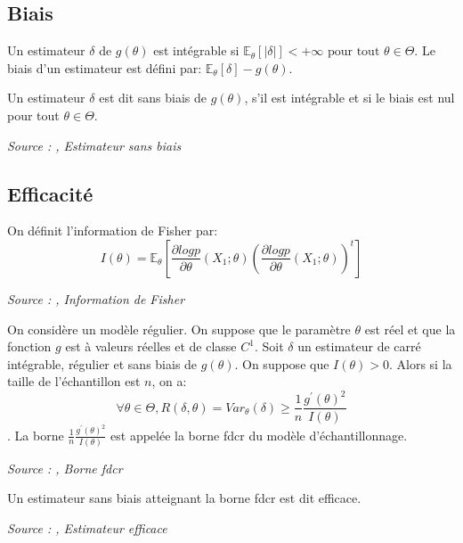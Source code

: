 \subsection{Biais}

\begin{definition}\label{def:biais}
Un estimateur $\delta$ de $g(\theta)$ est intégrable si $\mathbb{E}_\theta[|\delta|] < +\infty \text{ pour tout } \theta \in \Theta$.
Le biais d'un estimateur est défini par: $\mathbb{E}_\theta[\delta] - g(\theta)$.

Un estimateur $\delta$ est dit sans biais de $g(\theta)$, s'il est intégrable et si le biais est nul pour tout $\theta \in \Theta$.

\noindent\textit{Source : \cite{ensta_cours},  Estimateur sans biais}
\end{definition}


\subsection{Efficacité}

\begin{definition}\label{def:information_fisher}
On définit l'information de Fisher par:
$$I(\theta) = \mathbb{E}_\theta[\frac{\partial log p}{\partial\theta}(X_1; \theta)(\frac{\partial log p}{\partial\theta}(X_1; \theta))^t]$$

\noindent\textit{Source : \cite{ensta_cours},  Information de Fisher}
\end{definition}

\begin{definition}\label{def:borne_fdcr}
On considère un modèle régulier. On suppose que le paramètre $\theta$ est réel et que la fonction $g$ est à valeurs réelles et de classe $C^1$. Soit $\delta$ un estimateur de carré intégrable, régulier et sans biais de $g(\theta)$. On suppose que $I(\theta) > 0$. Alors si la taille de l'échantillon est $n$, on a:
$$\forall \theta \in \Theta, R(\delta, \theta) = Var_\theta(\delta) \ge \frac{1}{n}\frac{g^\prime(\theta)^2}{I(\theta)}$$.
La borne $\frac{1}{n}\frac{g^\prime(\theta)^2}{I(\theta)}$ est appelée la borne \gls{fdcr} du modèle d'échantillonnage.

\noindent\textit{Source : \cite{ensta_cours},  Borne \gls{fdcr}}
\end{definition}

\begin{definition}\label{def:estimateur_efficace}
Un estimateur sans biais atteignant la borne \gls{fdcr} est dit efficace.

\noindent\textit{Source : \cite{ensta_cours},  Estimateur efficace}
\end{definition}


